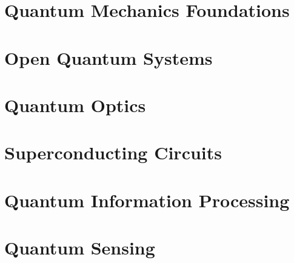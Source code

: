\documentclass[11pt,a4paper]{book}
\begin{document}
\tableofcontents



\mainmatter

\part{Quantum Mechanics Foundations}





\part{Open Quantum Systems}





\part{Quantum Optics}





\part{Superconducting Circuits}






\part{Quantum Information Processing}



\part{Quantum Sensing}







\appendix


\backmatter




\end{document}
